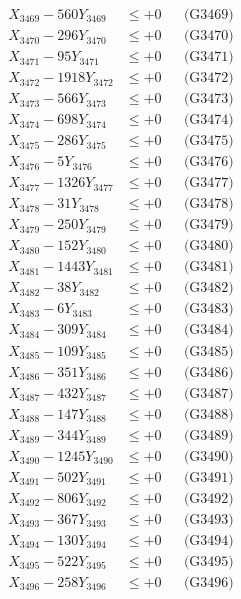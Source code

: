 \documentclass[a4paper,10pt]{article}
\begin{document}
{\begin{align}
X_{3469} - 560Y_{3469} &\leq +0 && \text{(G3469)} \\
X_{3470} - 296Y_{3470} &\leq +0 && \text{(G3470)} \\
\allowbreak
X_{3471} - 95Y_{3471} &\leq +0 && \text{(G3471)} \\
X_{3472} - 1918Y_{3472} &\leq +0 && \text{(G3472)} \\
X_{3473} - 566Y_{3473} &\leq +0 && \text{(G3473)} \\
X_{3474} - 698Y_{3474} &\leq +0 && \text{(G3474)} \\
X_{3475} - 286Y_{3475} &\leq +0 && \text{(G3475)} \\
X_{3476} - 5Y_{3476} &\leq +0 && \text{(G3476)} \\
X_{3477} - 1326Y_{3477} &\leq +0 && \text{(G3477)} \\
X_{3478} - 31Y_{3478} &\leq +0 && \text{(G3478)} \\
X_{3479} - 250Y_{3479} &\leq +0 && \text{(G3479)} \\
X_{3480} - 152Y_{3480} &\leq +0 && \text{(G3480)} \\
\allowbreak
X_{3481} - 1443Y_{3481} &\leq +0 && \text{(G3481)} \\
X_{3482} - 38Y_{3482} &\leq +0 && \text{(G3482)} \\
X_{3483} - 6Y_{3483} &\leq +0 && \text{(G3483)} \\
X_{3484} - 309Y_{3484} &\leq +0 && \text{(G3484)} \\
X_{3485} - 109Y_{3485} &\leq +0 && \text{(G3485)} \\
X_{3486} - 351Y_{3486} &\leq +0 && \text{(G3486)} \\
X_{3487} - 432Y_{3487} &\leq +0 && \text{(G3487)} \\
X_{3488} - 147Y_{3488} &\leq +0 && \text{(G3488)} \\
X_{3489} - 344Y_{3489} &\leq +0 && \text{(G3489)} \\
X_{3490} - 1245Y_{3490} &\leq +0 && \text{(G3490)} \\
\allowbreak
X_{3491} - 502Y_{3491} &\leq +0 && \text{(G3491)} \\
X_{3492} - 806Y_{3492} &\leq +0 && \text{(G3492)} \\
X_{3493} - 367Y_{3493} &\leq +0 && \text{(G3493)} \\
X_{3494} - 130Y_{3494} &\leq +0 && \text{(G3494)} \\
X_{3495} - 522Y_{3495} &\leq +0 && \text{(G3495)} \\
X_{3496} - 258Y_{3496} &\leq +0 && \text{(G3496)} \\

\end{align}}
\end{document}
